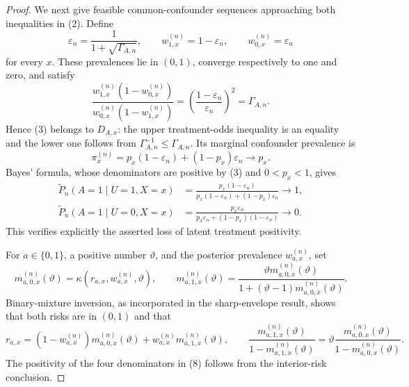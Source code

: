 \documentclass{article}
\begin{document}
\begin{proof}
We next give feasible common-confounder sequences approaching both inequalities in (2).  Define
\[
 \varepsilon_n=\frac{1}{1+\sqrt{\Gamma_{A,n}}},
 \qquad
 w_{1,x}^{(n)}=1-\varepsilon_n,
 \qquad
 w_{0,x}^{(n)}=\varepsilon_n
 \tag{3}
\]
for every \(x\).  These prevalences lie in \((0,1)\), converge respectively to one and zero, and satisfy
\[
 \frac{w_{1,x}^{(n)}(1-w_{0,x}^{(n)})}
      {w_{0,x}^{(n)}(1-w_{1,x}^{(n)})}
 =\left(\frac{1-\varepsilon_n}{\varepsilon_n}\right)^2
 =\Gamma_{A,n}.
 \tag{4}
\]
Hence (3) belongs to \(D_{A,x}\): the upper treatment-odds inequality is an equality and the lower one follows from \(\Gamma_{A,n}^{-1}\leq\Gamma_{A,n}\).  Its marginal confounder prevalence is
\[
 \pi_x^{(n)}=p_x(1-\varepsilon_n)+(1-p_x)\varepsilon_n\longrightarrow p_x.
 \tag{5}
\]
Bayes' formula, whose denominators are positive by (3) and \(0<p_x<1\), gives
\[
\begin{aligned}
 \widetilde P_n(A=1\mid U=1,X=x)
 &=\frac{p_x(1-\varepsilon_n)}
         {p_x(1-\varepsilon_n)+(1-p_x)\varepsilon_n}
 \longrightarrow1,\\
 \widetilde P_n(A=1\mid U=0,X=x)
 &=\frac{p_x\varepsilon_n}
         {p_x\varepsilon_n+(1-p_x)(1-\varepsilon_n)}
 \longrightarrow0.
\end{aligned}
\tag{6}
\]
This verifies explicitly the asserted loss of latent treatment positivity.

For \(a\in\{0,1\}\), a positive number \(\vartheta\), and the posterior prevalence \(w_{a,x}^{(n)}\), set
\[
 m_{a,0,x}^{(n)}(\vartheta)
   =\kappa(r_{a,x},w_{a,x}^{(n)},\vartheta),
 \qquad
 m_{a,1,x}^{(n)}(\vartheta)
   =\frac{\vartheta m_{a,0,x}^{(n)}(\vartheta)}
          {1+(\vartheta-1)m_{a,0,x}^{(n)}(\vartheta)}.
 \tag{7}
\]
Binary-mixture inversion, as incorporated in the sharp-envelope result, shows that both risks are in \((0,1)\) and that
\[
 r_{a,x}=(1-w_{a,x}^{(n)})m_{a,0,x}^{(n)}(\vartheta)
          +w_{a,x}^{(n)}m_{a,1,x}^{(n)}(\vartheta),
 \qquad
 \frac{m_{a,1,x}^{(n)}(\vartheta)}
      {1-m_{a,1,x}^{(n)}(\vartheta)}
 =\vartheta
  \frac{m_{a,0,x}^{(n)}(\vartheta)}
       {1-m_{a,0,x}^{(n)}(\vartheta)}.
 \tag{8}
\]
The positivity of the four denominators in (8) follows from the interior-risk conclusion.


\end{proof}
\end{document}
